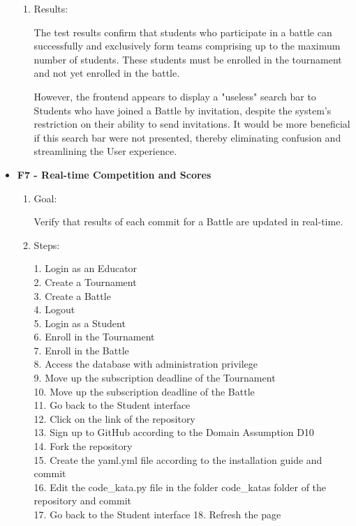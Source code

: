 \documentclass{Configuration_Files/Template}
\begin{document}
\begin{itemize}
\begin{enumerate}
        \item Results:
        
        The test results confirm that students who participate in a battle can successfully and exclusively form teams comprising up to the maximum number of students. These students must be enrolled in the tournament and not yet enrolled in the battle.

        However, the frontend appears to display a "useless" search bar to Students who have joined a Battle by invitation, despite the system's restriction on their ability to send invitations. It would be more beneficial if this search bar were not presented, thereby eliminating confusion and streamlining the User experience.\\
    
    \end{enumerate}
    
    \item \textbf{F7 - Real-time Competition and Scores}
    
    \begin{enumerate}
    
        \item Goal:
        
        Verify that results of each commit for a Battle are updated in real-time.
        
        \item Steps:
        
            1. Login as an Educator\\
            2. Create a Tournament\\
            3. Create a Battle\\
            4. Logout\\
            5. Login as a Student\\
            6. Enroll in the Tournament\\
            7. Enroll in the Battle\\
            8. Access the database with administration privilege\\
            9. Move up the subscription deadline of the Tournament\\
            10. Move up the subscription deadline of the Battle\\
            11. Go back to the Student interface\\
            12. Click on the link of the repository\\
            13. Sign up to GitHub according to the Domain Assumption D10\\
            14. Fork the repository\\
            15. Create the yaml.yml file according to the installation guide and commit\\
            16. Edit the code\_kata.py file in the folder code\_katas folder of the repository and commit\\
            17. Go back to the Student interface
            18. Refresh the page
        

\end{enumerate}
\end{itemize}
\end{document}
